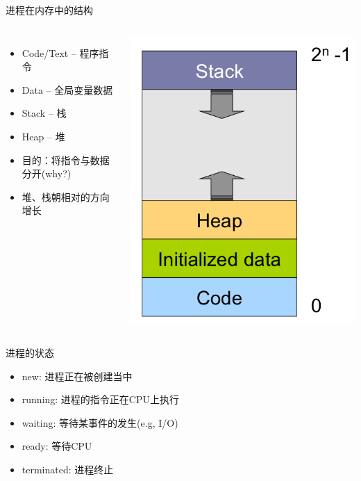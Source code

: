 \documentclass[xcolor=svgnames]{beamer}
\begin{document}
\begin{CJK*}{UTF8}{gbsn}
\begin{frame}{进程在内存中的结构}
\begin{columns}%
\begin{itemize}
\item Code/Text -- 程序指令
\item Data -- 全局变量数据
\item Stack -- 栈
\item Heap -- 堆
\item 目的：将指令与数据分开(why?)
\item 堆、栈朝相对的方向增长
\end{itemize}
\includegraphics[width=1.0\textwidth]{memory.png}
\end{columns}%
\end{frame}

\begin{frame}{进程的状态}
\begin{itemize}
\item new: 进程正在被创建当中
\item running: 进程的指令正在CPU上执行
\item waiting: 等待某事件的发生(e.g, I/O)
\item ready: 等待CPU
\item terminated: 进程终止
\end{itemize}
\end{frame}


\end{CJK*}
\end{document}
